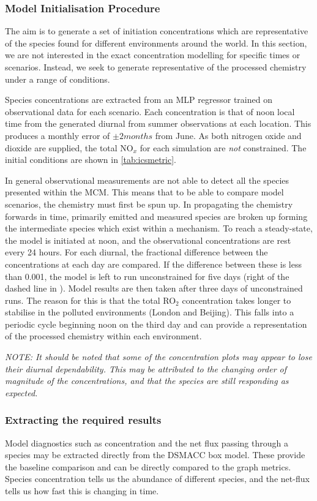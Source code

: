 \subsubsection{Model Initialisation Procedure}
The aim is to generate a set of initiation concentrations which are representative of the species found for different environments around the world. In this section, we are not interested in the exact concentration modelling for specific times or scenarios. Instead, we seek to generate representative of the processed chemistry under a range of conditions. 

Species concentrations are extracted from an MLP regressor trained on observational data for each scenario. Each concentration is that of noon local time from the generated diurnal from summer observations at each location. This produces a monthly error of $\pm 2 months$ from June. As both nitrogen oxide and dioxide are supplied, the total NO$_x$ for each simulation are \emph{not} constrained. The initial conditions are shown in \autoref{tab:icsmetric}.

In general observational measurements are not able to detect all the species presented within the MCM. This means that to be able to compare model scenarios, the chemistry must first be spun up. In propagating the chemistry forwards in time, primarily emitted and measured species are broken up forming the intermediate species which exist within a mechanism. To reach a steady-state, the model is initiated at noon, and the observational concentrations are rest every 24 hours. For each diurnal, the fractional difference between the concentrations at each day are compared. If the difference between these is less than 0.001, the model is left to run unconstrained for five days (right of the dashed line in ). Model results are then taken after three days of unconstrained runs. The reason for this is that the total RO$_2$ concentration takes longer to stabilise in the polluted environments (London and Beijing). This falls into a periodic cycle beginning noon on the third day and can provide a representation of the processed chemistry within each environment. 

\textit{NOTE: It should be noted that some of the concentration plots may appear to lose their diurnal dependability. This may be attributed to the changing order of magnitude of the concentrations, and that the species are still responding as expected. }

\subsubsection{Extracting the required results}
Model diagnostics such as concentration and the net flux passing through a species may be extracted directly from the DSMACC box model. These provide the baseline comparison and can be directly compared to the graph metrics. Species concentration tells us the abundance of different species, and the net-flux tells us how fast this is changing in time. 

